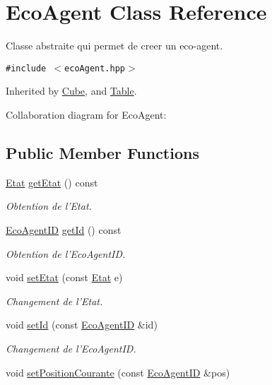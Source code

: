 \hypertarget{classEcoAgent}{
\section{EcoAgent Class Reference}
\label{classEcoAgent}
}
Classe abstraite qui permet de creer un eco-agent.  


{\tt \#include $<$ecoAgent.hpp$>$}

Inherited by \hyperlink{classCube}{Cube}, and \hyperlink{classTable}{Table}.

Collaboration diagram for EcoAgent:\subsection*{Public Member Functions}
\begin{CompactItemize}
\item 
\hyperlink{etat_8hpp_767b7a63d7677f92d697621b4166af1b}{Etat} \hyperlink{classEcoAgent_91160732f8c4dd585ac5d8ad69bf3891}{getEtat} () const 
\begin{CompactList}\small\item\em Obtention de l'Etat. \item\end{CompactList}\item 
\hyperlink{classEcoAgentID}{EcoAgentID} \hyperlink{classEcoAgent_9584d21ca52b786efc1b988a65683274}{getId} () const 
\begin{CompactList}\small\item\em Obtention de l'EcoAgentID. \item\end{CompactList}\item 
void \hyperlink{classEcoAgent_e06a7430bd88705a327cf498c8420a2b}{setEtat} (const \hyperlink{etat_8hpp_767b7a63d7677f92d697621b4166af1b}{Etat} e)
\begin{CompactList}\small\item\em Changement de l'Etat. \item\end{CompactList}\item 
void \hyperlink{classEcoAgent_ef2dde1272916b9f3a8f5a663bf96f69}{setId} (const \hyperlink{classEcoAgentID}{EcoAgentID} \&id)
\begin{CompactList}\small\item\em Changement de l'EcoAgentID. \item\end{CompactList}\item 
void \hyperlink{classEcoAgent_0365707b7bc808dd45fb34d1c076f362}{setPositionCourante} (const \hyperlink{classEcoAgentID}{EcoAgentID} \&pos)

\end{CompactItemize}
